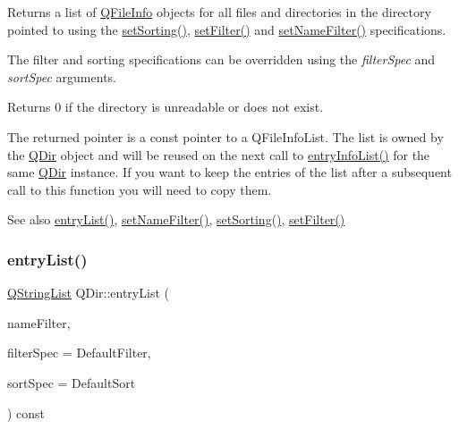 Returns a list of \mbox{\hyperlink{class_q_file_info}{Q\+File\+Info}} objects for all files and directories in the directory pointed to using the \mbox{\hyperlink{class_q_dir_a65280d204cd65975953e3eb2a63da778}{set\+Sorting()}}, \mbox{\hyperlink{class_q_dir_a68d9e723870b5f8226353dc6047a35ee}{set\+Filter()}} and \mbox{\hyperlink{class_q_dir_a26b95e183a9ba9410219a3ce4d8c3416}{set\+Name\+Filter()}} specifications.

The filter and sorting specifications can be overridden using the {\itshape filter\+Spec} and {\itshape sort\+Spec} arguments.

Returns 0 if the directory is unreadable or does not exist.

The returned pointer is a const pointer to a Q\+File\+Info\+List. The list is owned by the \mbox{\hyperlink{class_q_dir}{Q\+Dir}} object and will be reused on the next call to \mbox{\hyperlink{class_q_dir_ada9ea9da108cbebd0ac88231f39fced0}{entry\+Info\+List()}} for the same \mbox{\hyperlink{class_q_dir}{Q\+Dir}} instance. If you want to keep the entries of the list after a subsequent call to this function you will need to copy them.

\begin{DoxySeeAlso}{See also}
\mbox{\hyperlink{class_q_dir_ab5e2b4ce772dc4b8941425cf780df9ab}{entry\+List()}}, \mbox{\hyperlink{class_q_dir_a26b95e183a9ba9410219a3ce4d8c3416}{set\+Name\+Filter()}}, \mbox{\hyperlink{class_q_dir_a65280d204cd65975953e3eb2a63da778}{set\+Sorting()}}, \mbox{\hyperlink{class_q_dir_a68d9e723870b5f8226353dc6047a35ee}{set\+Filter()}} 
\end{DoxySeeAlso}
\mbox{\label{class_q_dir_aa575c8ea3470de67aaffc928f8a13a8c}} 
\subsubsection{\texorpdfstring{entryList()}{entryList()}\hspace{0.1cm}{\footnotesize\ttfamily [1/2]}}
{\footnotesize\ttfamily \mbox{\hyperlink{class_q_string_list}{Q\+String\+List}} Q\+Dir\+::entry\+List (\begin{DoxyParamCaption}\item[{const \mbox{\hyperlink{class_q_string}{Q\+String}} \&}]{name\+Filter,  }\item[{int}]{filter\+Spec = {\ttfamily DefaultFilter},  }\item[{int}]{sort\+Spec = {\ttfamily DefaultSort} }\end{DoxyParamCaption}) const\hspace{0.3cm}{\ttfamily [virtual]}}

